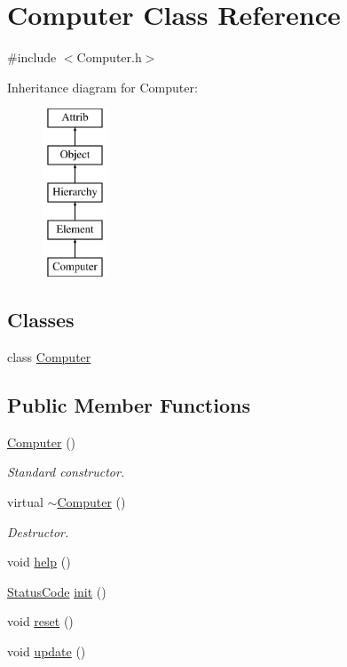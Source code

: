 \hypertarget{classComputer}{}\section{Computer Class Reference}
\label{classComputer}


{\ttfamily \#include $<$Computer.\+h$>$}

Inheritance diagram for Computer\+:\begin{figure}[H]
\begin{center}
\leavevmode
\includegraphics[height=5.000000cm]{classComputer}
\end{center}
\end{figure}
\subsection*{Classes}
\begin{DoxyCompactItemize}
\item 
class \hyperlink{classComputer_1_1Computer}{Computer}
\end{DoxyCompactItemize}
\subsection*{Public Member Functions}
\begin{DoxyCompactItemize}
\item 
\hyperlink{classComputer_a52056dfe9041f024ac58c1eaf02945d3}{Computer} ()
\begin{DoxyCompactList}\small\item\em Standard constructor. \end{DoxyCompactList}\item 
virtual \hyperlink{classComputer_a633f86288c20c5aa1eed7f14fb069272}{$\sim$\+Computer} ()
\begin{DoxyCompactList}\small\item\em Destructor. \end{DoxyCompactList}\item 
void \hyperlink{classComputer_aeca79382f17fcfb43320902de5f20aca}{help} ()
\item 
\hyperlink{classStatusCode}{Status\+Code} \hyperlink{classComputer_a47ed8b470445d545bffefca31296e754}{init} ()
\item 
void \hyperlink{classComputer_aeab90cbacbef385685717c249a07929d}{reset} ()
\item 
void \hyperlink{classComputer_aaad6dfbfcc6843d73f49e0fc1535563e}{update} ()
\end{DoxyCompactItemize}
